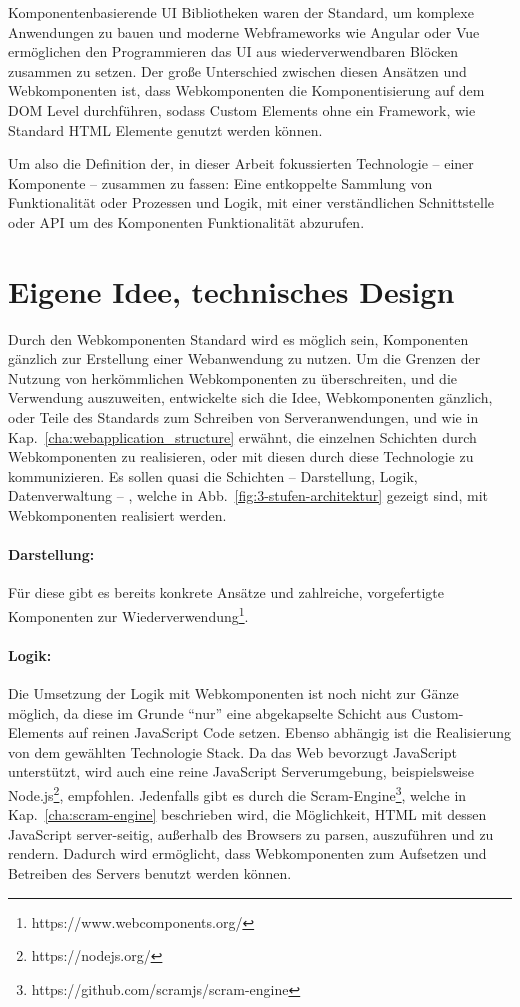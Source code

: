 Komponentenbasierende UI Bibliotheken waren der Standard, um komplexe Anwendungen zu bauen und moderne Webframeworks wie Angular oder Vue ermöglichen den Programmieren das UI aus wiederverwendbaren Blöcken zusammen zu setzen. Der große Unterschied zwischen diesen Ansätzen und Webkomponenten ist, dass Webkomponenten die Komponentisierung auf dem DOM Level durchführen, sodass Custom Elements ohne ein Framework, wie Standard HTML Elemente genutzt werden können. 

Um also die Definition der, in dieser Arbeit fokussierten Technologie -- einer Komponente -- zusammen zu fassen: Eine entkoppelte Sammlung von Funktionalität oder Prozessen und Logik, mit einer verständlichen Schnittstelle oder API um des Komponenten Funktionalität abzurufen.


\section{Eigene Idee, technisches Design}
Durch den Webkomponenten Standard wird es möglich sein, Komponenten gänzlich zur Erstellung einer Webanwendung zu nutzen. Um die Grenzen der Nutzung von herkömmlichen Webkomponenten zu überschreiten, und die Verwendung auszuweiten, entwickelte sich die Idee, Webkomponenten gänzlich, oder Teile des Standards zum Schreiben von Serveranwendungen, und wie in Kap.~\ref{cha:webapplication_structure} erwähnt, die einzelnen Schichten durch Webkomponenten zu realisieren, oder mit diesen durch diese Technologie zu kommunizieren. Es sollen quasi die Schichten -- Darstellung, Logik, Datenverwaltung -- , welche in Abb.~\ref{fig:3-stufen-architektur} gezeigt sind, mit Webkomponenten realisiert werden. 

\paragraph{Darstellung:}Für diese gibt es bereits konkrete Ansätze und zahlreiche, vorgefertigte Komponenten zur Wiederverwendung\footnote{https://www.webcomponents.org/}.

\paragraph{Logik: }Die Umsetzung der Logik mit Webkomponenten ist noch nicht zur Gänze möglich, da diese im Grunde "`nur"' eine abgekapselte Schicht aus Custom-Elements auf reinen JavaScript Code setzen. Ebenso abhängig ist die Realisierung von dem gewählten Technologie Stack. Da das Web bevorzugt JavaScript unterstützt, wird auch eine reine JavaScript Serverumgebung, beispielsweise Node.js\footnote{https://nodejs.org/}, empfohlen. Jedenfalls gibt es durch die Scram-Engine\footnote{https://github.com/scramjs/scram-engine}, welche in Kap.~\ref{cha:scram-engine} beschrieben wird, die Möglichkeit, HTML mit dessen JavaScript server-seitig, außerhalb des Browsers zu parsen, auszuführen und zu rendern. Dadurch wird ermöglicht, dass Webkomponenten zum Aufsetzen und Betreiben des Servers benutzt werden können.

